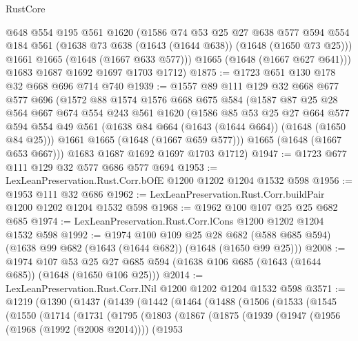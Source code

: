 \begin{lexlean}{RustCore}
\begin{coremodule}
        @648
        @554
        @195
        @561
        @1620
        (@1586
          @74
          @53
          @25
          @27
          @638
          @577
          @594
          @554
          @184
          @561
          (@1638 @73 @638 (@1643 (@1644 @638)) (@1648 (@1650 @73 @25)))
          @1661
          @1665
          (@1648 (@1667 @633 @577)))
        @1665
        (@1648 (@1667 @627 @641)))
      @1683
      @1687
      @1692
      @1697
      @1703
      @1712)
@1875 := @1723 @651 @130 @178 @32 @668 @696 @714 @740
@1939 := @1557
    @89
    @111
    @129
    @32
    @668
    @677
    @577
    @696
    (@1572
      @88
      @1574
      @1576
      @668
      @675
      @584
      (@1587
        @87
        @25
        @28
        @564
        @667
        @674
        @554
        @243
        @561
        @1620
        (@1586
          @85
          @53
          @25
          @27
          @664
          @577
          @594
          @554
          @49
          @561
          (@1638 @84 @664 (@1643 (@1644 @664)) (@1648 (@1650 @84 @25)))
          @1661
          @1665
          (@1648 (@1667 @659 @577)))
        @1665
        (@1648 (@1667 @653 @667)))
      @1683
      @1687
      @1692
      @1697
      @1703
      @1712)
@1947 := @1723 @677 @111 @129 @32 @577 @686 @577 @694
@1953 := LexLeanPreservation.Rust.Corr.bOfE @1200 @1202 @1204 @1532 @598
@1956 := @1953 @111 @32 @686
@1962 := LexLeanPreservation.Rust.Corr.buildPair @1200 @1202 @1204 @1532 @598
@1968 := @1962 @100 @107 @25 @25 @682 @685
@1974 := LexLeanPreservation.Rust.Corr.lCons @1200 @1202 @1204 @1532 @598
@1992 := @1974
    @100
    @109
    @25
    @28
    @682
    (@588 @685 @594)
    (@1638 @99 @682 (@1643 (@1644 @682)) (@1648 (@1650 @99 @25)))
@2008 := @1974
    @107
    @53
    @25
    @27
    @685
    @594
    (@1638 @106 @685 (@1643 (@1644 @685)) (@1648 (@1650 @106 @25)))
@2014 := LexLeanPreservation.Rust.Corr.lNil @1200 @1202 @1204 @1532 @598
@3571 := @1219
    (@1390
      (@1437
        (@1439
          (@1442
            (@1464
              (@1488
                (@1506
                  (@1533
                    (@1545
                      (@1550
                        (@1714
                          (@1731
                            (@1795
                              (@1803
                                (@1867
                                  (@1875
                                    (@1939
                                      (@1947
                                        (@1956 (@1968 (@1992 (@2008 @2014))))
                                        (@1953

\end{coremodule}
\end{lexlean}
